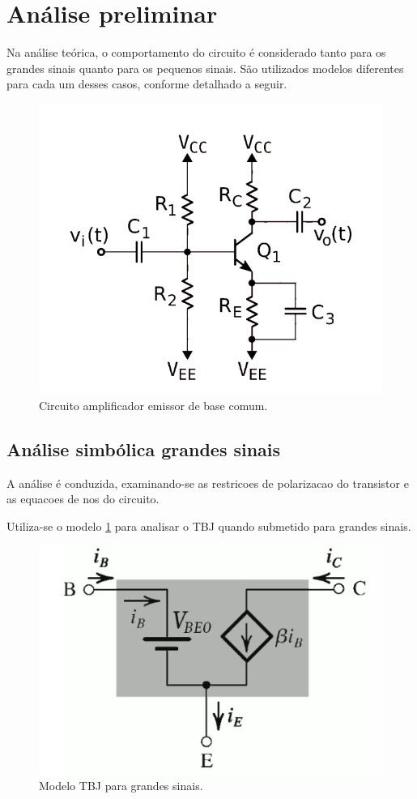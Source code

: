 \section{Análise preliminar}

Na análise teórica, o comportamento do circuito é considerado tanto para os grandes sinais quanto para os pequenos sinais. São utilizados modelos diferentes para cada um desses casos, conforme detalhado a seguir.

\begin{figure}[H]
    \centering
    \includegraphics[width=0.5\columnwidth]{images/o_circuito.png}
    \caption{Circuito amplificador emissor de base comum.}
\end{figure}

\subsection{Análise simbólica grandes sinais}

A análise é conduzida, examinando-se as restricoes de polarizacao do transistor e as equacoes de nos do circuito.

Utiliza-se o modelo \ref{fig:modelo_grandes_sinais} para analisar o TBJ quando submetido para grandes sinais.

\begin{figure}[H]
    \centering
    \includegraphics[width=0.5\columnwidth]{images/modelo_grandes_sinais.png}
    \caption{Modelo TBJ para grandes sinais.}
    \label{fig:modelo_grandes_sinais}
\end{figure}

